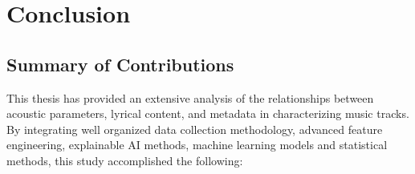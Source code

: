 \chapter{Conclusion}
\label{cha:conclusion}

\section{Summary of Contributions}
\label{sec:summaryofcontributions}

This thesis has provided an extensive analysis of the relationships between
acoustic parameters, lyrical content, and metadata in characterizing music
tracks. By integrating well organized data collection methodology, advanced
feature engineering, explainable AI methods, machine learning models and
statistical methods, this study accomplished the following:

